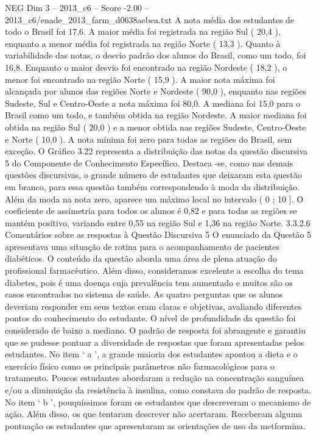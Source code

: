 \begin{textsample}{NEG Dim 3 – 2013\_c6 – Score -2.00 – 2013\_c6/enade\_2013\_farm\_d0638aebea.txt}
A nota média dos estudantes de todo o Brasil foi 17,6.
A maior média foi registrada na região Sul ( 20,4 ), enquanto a menor média foi registrada na região Norte ( 13,3 ).
Quanto à variabilidade das notas, o desvio padrão dos alunos do Brasil, como um todo, foi 16,8.
Enquanto o maior desvio foi encontrado na região Nordeste ( 18,2 ), o menor foi encontrado na região Norte ( 15,9 ).
A maior nota máxima foi alcançada por alunos das regiões Norte e Nordeste ( 90,0 ), enquanto nas regiões Sudeste, Sul e Centro-Oeste a nota máxima foi 80,0.
A mediana foi 15,0 para o Brasil como um todo, e também obtida na região Nordeste.
A maior mediana foi obtida na região Sul ( 20,0 ) e a menor obtida nas regiões Sudeste, Centro-Oeste e Norte ( 10,0 ).
A nota mínima foi zero para todas as regiões do Brasil, sem exceção.
O Gráfico 3.22 representa a distribuição das notas da questão discursiva 5 do Componente de Conhecimento Específico.
Destaca -se, como nas demais questões discursivas, o grande número de estudantes que deixaram esta questão em branco, para essa questão também correspondendo à moda da distribuição.
Além da moda na nota zero, aparece um máximo local no intervalo ( 0 ; 10 ].
O coeficiente de assimetria para todos os alunos é 0,82 e para todas as regiões se mantém positivo, variando entre 0,55 na região Sul e 1,36 na região Norte. 3.3.2.6 Comentários sobre as respostas à Questão Discursiva 5 O enunciado da Questão 5 apresentava uma situação de rotina para o acompanhamento de pacientes diabéticos.
O conteúdo da questão aborda uma área de plena atuação do profissional farmacêutico.
Além disso, consideramos excelente a escolha do tema diabetes, pois é uma doença cuja prevalência tem aumentado e muitos são os casos encontrados no sistema de saúde.
As quatro perguntas que os alunos deveriam responder em seus textos eram claras e objetivas, avaliando diferentes pontos do conhecimento do estudante.
O nível de profundidade da questão foi considerado de baixo a mediano.
O padrão de resposta foi abrangente e garantiu que se pudesse pontuar a diversidade de respostas que foram apresentadas pelos estudantes.
No item ‘ a ’, a grande maioria dos estudantes apontou a dieta e o exercício físico como os principais parâmetros não farmacológicos para o tratamento.
Poucos estudantes abordaram a redução na concentração sanguínea e/ou a diminuição da resistência à insulina, como constava do padrão de resposta.
No item ‘ b ’, pouquíssimos foram os estudantes que descreveram o mecanismo de ação.
Além disso, os que tentaram descrever não acertaram.
Receberam alguma pontuação os estudantes que apresentaram as orientações de uso da metformina.

\end{textsample}
